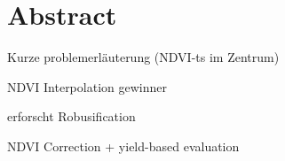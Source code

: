 \chapter*{Abstract}

Kurze problemerläuterung (NDVI-ts im Zentrum)

NDVI Interpolation gewinner

erforscht Robusification 

NDVI Correction + yield-based evaluation

